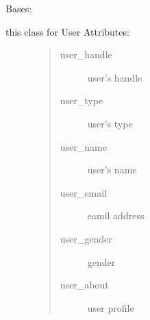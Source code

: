 \documentclass[letterpaper,10pt,english]{sphinxmanual}
\begin{document}

\begin{fulllineitems}
\label{\detokenize{janta:janta.models.User}}
Bases: 
\begin{description}
\item[{this class for User Attributes:}] \leavevmode\begin{quote}\begin{description}
\item[{user\_handle}] \leavevmode
user’s handle

\item[{user\_type}] \leavevmode
user’s type

\item[{user\_name}] \leavevmode
user’s name

\item[{user\_email}] \leavevmode
eamil address

\item[{user\_gender}] \leavevmode
gender

\item[{user\_about}] \leavevmode
user profile

\end{description}\end{quote}

\end{description}

\begin{fulllineitems}
\label{\detokenize{janta:janta.models.User.set_user}}
\end{fulllineitems}


\end{fulllineitems}

\end{document}
